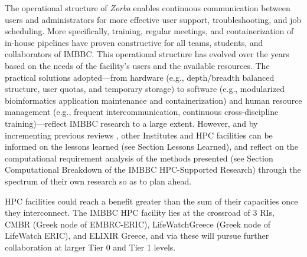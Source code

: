    The operational structure of \textit{Zorba} enables continuous communication between users and administrators for more effective user support, troubleshooting, and job scheduling. 
   More specifically, training, regular meetings, and containerization of in-house pipelines have proven constructive for all teams, students, and collaborators of IMBBC. 
   This operational structure has evolved over the years based on the needs of the facility’s users and the available resources. 
   The practical solutions adopted—from hardware (e.g., depth/breadth balanced structure, user quotas, and temporary storage) to software (e.g., modularized bioinformatics application maintenance and containerization) and human resource management (e.g., frequent intercommunication, continuous cross-discipline training)—reflect IMBBC research to a large extent. 
   However, and by incrementing previous reviews \citep{lampa2013lessons}, other Institutes and HPC facilities can be informed on the lessons learned (see Section Lessons Learned), and reflect on the computational requirement analysis of the methods presented (see Section Computational Breakdown of the IMBBC HPC-Supported Research) through the spectrum of their own research so as to plan ahead.

   HPC facilities could reach a benefit greater than the sum of their capacities once they interconnect. The IMBBC HPC facility lies at the crossroad of $3$ RIs, CMBR (Greek node of EMBRC-ERIC), LifeWatchGreece (Greek node of LifeWatch ERIC), and ELIXIR Greece, and via these will pursue further collaboration at larger Tier 0 and Tier 1 levels.


